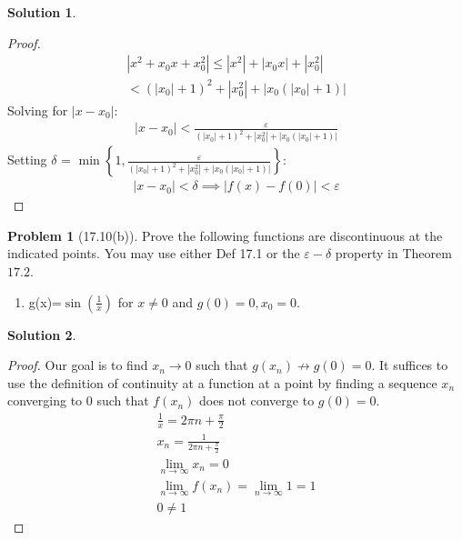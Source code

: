 \documentclass[12pt]{article}
\theoremstyle{definition} %
\newtheorem{solution}{Solution}
\newtheorem{problem}{Problem}
\theoremstyle{plain} %
\begin{document}
\begin{solution}
\begin{enumerate}
\begin{proof}
\begin{align}
        \left\vert x^{2}+x_{0}x+x_{0}^{2}  \right\vert \leq \left\vert x^{2} \right\vert +\left\vert x_{0}x  \right\vert +\left\vert x_{0}^{2} \right\vert \\[10pt] 
        < \left( \left\vert x_0 \right\vert  +1\right)^{2}+\left\vert x_{0}^{2} \right\vert +\left\vert x_0 (\left\vert x_0 \right\vert +1) \right\vert 
      \end{align}
      Solving for \(\left\vert x-x_0 \right\vert \):
      \begin{align}
         \left\vert x-x_0 \right\vert < \frac{\varepsilon}{\left( \left\vert x_0 \right\vert  +1\right)^{2}+\left\vert x_{0}^{2} \right\vert +\left\vert x_0 (\left\vert x_0 \right\vert +1) \right\vert}
      \end{align}
      Setting \(\delta\) = \(\mathop{\min}\left\{ 1, \frac{\varepsilon}{\left( \left\vert x_0 \right\vert  +1\right)^{2}+\left\vert x_{0}^{2} \right\vert +\left\vert x_0 (\left\vert x_0 \right\vert +1) \right\vert}
\right\} \):
\begin{align}
   \left\vert x-x_0 \right\vert <\delta \implies \left\vert f(x)-f(0) \right\vert <\varepsilon
\end{align}
  \end{proof}
   \end{enumerate}
   \end{solution}


\begin{problem}[17.10(b)]
   Prove the following functions are discontinuous at the indicated points. You may use either Def 17.1 or the \(\varepsilon-\delta\) property in Theorem \(17.2\).
   \begin{enumerate}
    \item g(x)=\(\sin \left( \frac{1}{x} \right) \) for \(x\neq 0\) and \(g(0)=0,x_{0}=0  \).
   \end{enumerate}   
\end{problem}
\begin{solution} 
   \begin{proof}
     Our goal is to find \(x_{n}\to 0\) such that \(g(x_{n})\not\to g(0)=0\). It suffices to use the definition of continuity at a function at a point by finding a sequence \(x_{n}\) converging to \(0\) such that \(f(x_{n})\) does not converge to \(g(0)=0\). 
    \begin{align}
      \frac{1}{x}=2\pi n+\frac{\pi}{2}\\[10pt] 
      x_{n}=\frac{1}{2\pi n+\frac{\pi}{2}} \\[10pt] 
      \lim_{n \to \infty} x_{n}=0 \\[10pt] 
      \lim_{n \to \infty} f(x_{n})=\lim_{n \to \infty} 1 = 1 \\[10pt] 
      0 \neq 1
    \end{align}
    
   \end{proof}
    \end{solution}
\end{document}
